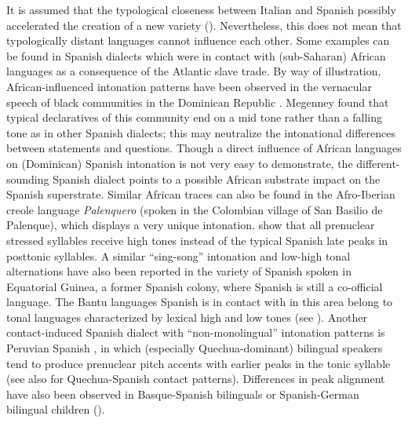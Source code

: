 It is assumed that the typological closeness between Italian and Spanish possibly accelerated the creation of a new variety (\citealt[107]{ColantoniGurlekian2004}). Nevertheless, this does not mean that typologically distant languages cannot influence each other. Some examples can be found in Spanish dialects which were in contact with (sub-Saharan) African languages as a consequence of the Atlantic slave trade. By way of illustration, African-influenced intonation patterns have been observed in the vernacular speech of black communities in the Dominican Republic \citep{Megenney1982}. Megenney found that typical declaratives of this community end on a mid tone rather than a falling tone as in other Spanish dialects; this may neutralize the intonational differences between statements and questions. Though a direct influence of African languages on (Dominican) Spanish intonation is not very easy to demonstrate, the different-sounding Spanish dialect points to a possible African substrate impact on the Spanish superstrate. Similar African traces can also be found in the Afro-Iberian creole language \textit{Palenquero} (spoken in the Colombian village of San Basilio de Palenque), which displays a very unique intonation. \citet{HualdeSchwegler2008} show that all prenuclear stressed syllables receive high tones instead of the typical Spanish late peaks in posttonic syllables. A similar “sing-song” intonation and low-high tonal alternations have also been reported in the variety of Spanish spoken in Equatorial Guinea, a former Spanish colony, where Spanish is still a co-official language. The Bantu languages Spanish is in contact with in this area belong to tonal languages characterized by lexical high and low tones (see \citealt{Lipski2005,Lipski2010}). Another contact-induced Spanish dialect with “non-monolingual” intonation patterns is Peruvian Spanish \citep{ORourke2004}, in which (especially Quechua-dominant) bilingual speakers tend to produce prenuclear pitch accents with earlier peaks in the tonic syllable (see also \citealt{Buchholz2021} for Quechua-Spanish contact patterns). Differences in peak alignment have also been observed in Basque-Spanish bilinguals \citep{Elordieta2003} or Spanish-German bilingual children (\citealt{LleóEtAl2004, Lleó2016}).



